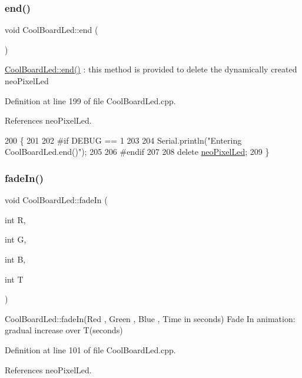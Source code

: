 \subsubsection{\texorpdfstring{end()}{end()}}
{\footnotesize\ttfamily void Cool\+Board\+Led\+::end (\begin{DoxyParamCaption}{ }\end{DoxyParamCaption})}

\hyperlink{classCoolBoardLed_a69f323359e0c9f797422f2152b5d41ef}{Cool\+Board\+Led\+::end()} \+: this method is provided to delete the dynamically created neo\+Pixel\+Led 

Definition at line 199 of file Cool\+Board\+Led.\+cpp.



References neo\+Pixel\+Led.


\begin{DoxyCode}
200 \{
201 
202 \textcolor{preprocessor}{#if DEBUG == 1 }
203     
204     Serial.println(\textcolor{stringliteral}{"Entering CoolBoardLed.end()"});
205 
206 \textcolor{preprocessor}{#endif}
207 
208     \textcolor{keyword}{delete} \hyperlink{classCoolBoardLed_ac2c13fa462a010cd9242bf297c013923}{neoPixelLed};
209 \}
\end{DoxyCode}
\mbox{\label{classCoolBoardLed_aec915442a8441c7cd45c3279d3ff8821}} 
\subsubsection{\texorpdfstring{fade\+In()}{fadeIn()}}
{\footnotesize\ttfamily void Cool\+Board\+Led\+::fade\+In (\begin{DoxyParamCaption}\item[{int}]{R,  }\item[{int}]{G,  }\item[{int}]{B,  }\item[{int}]{T }\end{DoxyParamCaption})}

Cool\+Board\+Led\+::fade\+In(\+Red , Green , Blue , Time in seconds) Fade In animation\+: gradual increase over T(seconds) 

Definition at line 101 of file Cool\+Board\+Led.\+cpp.



References neo\+Pixel\+Led.


